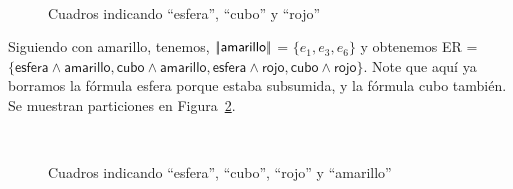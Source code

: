\begin{figure}[ht]
\begin{center}
\\[0pt]
\caption{Cuadros indicando ``esfera'', ``cubo'' y ``rojo''}
\label{fig-modelo9}
\end{center}
\end{figure}
%
Siguiendo con \textsf{amarillo}, tenemos, $|\!|\textsf{amarillo}|\!|$ = $\{e_1, e_3, e_6\}$ y obtenemos ER = $\{\textsf{esfera} \wedge \textsf{amarillo}, \textsf{cubo} \wedge \textsf{amarillo}, \textsf{esfera} \wedge \textsf{rojo}, \textsf{cubo} \wedge \textsf{rojo}\}$. 
Note que aqu\'i ya borramos la f\'ormula \textsf{esfera} porque estaba subsumida, y la f\'ormula \textsf{cubo} tambi\'en. Se muestran particiones en Figura~\ref{fig-modelo10}.

%

\begin{figure}[ht]
\begin{center}
\\[0pt]
\caption{Cuadros indicando ``esfera'', ``cubo'', ``rojo'' y ``amarillo''}
\label{fig-modelo10}
\end{center}
\end{figure}

